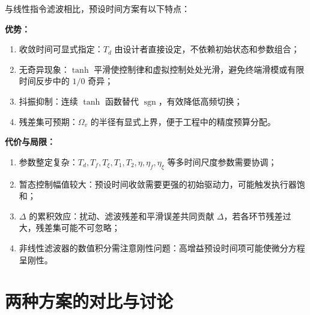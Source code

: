\documentclass[UTF8,a4paper,11pt]{ctexart}
\begin{document}
与线性指令滤波相比，预设时间方案有以下特点：

\textbf{优势：}
\begin{enumerate}
  \item 收敛时间可显式指定：$T_d$ 由设计者直接设定，不依赖初始状态和参数组合；
  \item 无奇异现象：$\tanh$ 平滑使控制律和虚拟控制处处光滑，避免终端滑模或有限时间反步中的 $1/0$ 奇异；
  \item 抖振抑制：连续 $\tanh$ 函数替代 $\operatorname{sgn}$，有效降低高频切换；
  \item 残差集可预期：$\Omega_v$ 的半径有显式上界，便于工程中的精度预算分配。
\end{enumerate}

\textbf{代价与局限：}
\begin{enumerate}
  \item 参数整定复杂：$T_d, T_f, T_{\xi}, T_1, T_2, \eta, \eta_f, \eta_{\xi}$ 等多时间尺度参数需要协调；
  \item 暂态控制幅值较大：预设时间收敛需要更强的初始驱动力，可能触发执行器饱和；
  \item $\Delta$ 的累积效应：扰动、滤波残差和平滑误差共同贡献 $\Delta$，若各环节残差过大，残差集可能不可忽略；
  \item 非线性滤波器的数值积分需注意刚性问题：高增益预设时间项可能使微分方程呈刚性。
\end{enumerate}

\section{两种方案的对比与讨论}
\end{document}
